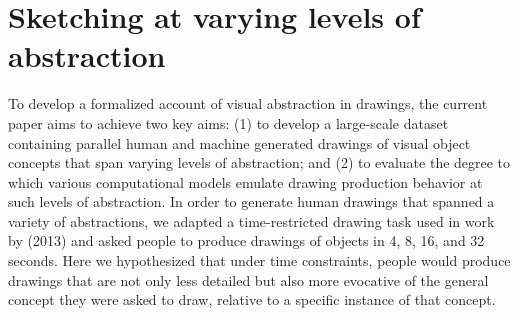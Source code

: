 \documentclass[10pt,letterpaper]{article}
\begin{document}

\section{Sketching at varying levels of abstraction}
To develop a formalized account of visual abstraction in drawings, the current paper aims to achieve two key aims: 
(1) to develop a large-scale dataset containing parallel human and machine generated drawings of visual object concepts that span varying levels of abstraction; 
and (2) to evaluate the degree to which various computational models emulate drawing production behavior at such levels of abstraction. 
In order to generate human drawings that spanned a variety of abstractions, we adapted a time-restricted drawing task used in work by \citeauthor{berger2013style} (2013) and asked people to produce drawings of objects in 4, 8, 16, and 32 seconds.
Here we hypothesized that under time constraints, people would produce drawings that are not only less detailed but also more evocative of the general concept they were asked to draw, relative to a specific instance of that concept.
\end{document}
